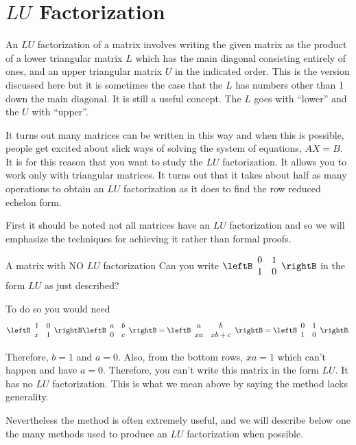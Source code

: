 \section{$LU$ Factorization}

An $LU$ factorization of a matrix involves writing the given matrix as the
product of a lower triangular matrix $L$ which has the main diagonal consisting
entirely of ones, and an upper triangular matrix $U$ in the indicated
order. This is the version discussed here but it is sometimes the case that
the $L$ has numbers other than 1 down the main diagonal. It is still a
useful concept. The $L$ goes with ``lower'' and the $U$ with ``upper''.


It turns out many matrices can be written in this way and when this is
possible, people get excited about slick ways of solving the system of
equations, $AX=B$. It is for this reason that you want to
study the $LU$ factorization. It allows you to work only with
triangular matrices. It turns out that it takes about half as many
operations to obtain an $LU$ factorization as it does to find the row
reduced echelon form.

First it should be noted not all matrices have an $LU$ factorization and so
we will emphasize the techniques for achieving it rather than formal proofs.

\begin{example}{A matrix with NO $LU$ factorization}{}
Can you write $\leftB
\begin{array}{rr}
0 & 1 \\
1 & 0
\end{array}
\rightB $ in the form $LU$ as just described?
\end{example}

\begin{solution}
To do so you would need 
\begin{equation*}
\leftB 
\begin{array}{rr}
1 & 0 \\ 
x & 1
\end{array}
\rightB \leftB 
\begin{array}{rr}
a & b \\ 
0 & c
\end{array}
\rightB =\allowbreak \leftB 
\begin{array}{cc}
a & b \\ 
xa & xb+c
\end{array}
\rightB =\leftB 
\begin{array}{rr}
0 & 1 \\ 
1 & 0
\end{array}
\rightB .
\end{equation*}

Therefore, $b=1$ and $a=0.$ Also, from the bottom rows, $xa=1$ which can't
happen and have $a=0.$ Therefore, you can't write this matrix in the form $%
LU.$ It has no $LU$ factorization. This is what we mean above by saying the
method lacks generality.

Nevertheless the method is often extremely useful, and we will describe
below one the many methods used to produce an $LU$ factorization when
possible.
\end{solution}